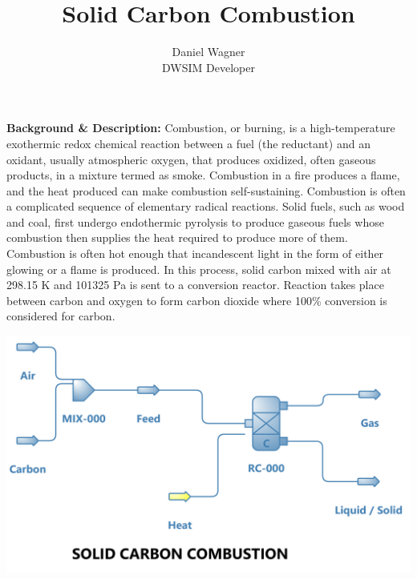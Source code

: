 \documentclass[a4paper,12pt]{article}
\title{Solid Carbon Combustion}
\author{Daniel Wagner \\ DWSIM Developer}
\date{}
\begin{document}
\maketitle

\noindent \textbf{Background \& Description:}
\newline Combustion, or burning, is a high-temperature exothermic redox chemical reaction between a fuel (the reductant) and an oxidant, usually atmospheric oxygen, that produces oxidized, often gaseous products, in a mixture termed as smoke. Combustion in a fire produces a flame, and the heat produced can make combustion self-sustaining. Combustion is often a complicated sequence of elementary radical reactions. Solid fuels, such as wood and coal, first undergo endothermic pyrolysis to produce gaseous fuels whose combustion then supplies the heat required to produce more of them. Combustion is often hot enough that incandescent light in the form of either glowing or a flame is produced.
In this process, solid carbon mixed with air at 298.15 K and 101325 Pa is sent to a conversion reactor. Reaction takes place between carbon and oxygen to form carbon dioxide where 100\% conversion is considered for carbon.

\vspace{25mm}
\centerline{\includegraphics[width=1\linewidth]{Carbon-Combustion.png}}
\end{document}
